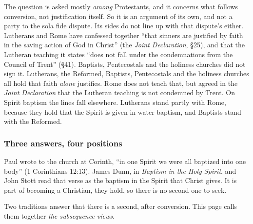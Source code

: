 \documentclass[11pt]{article}
\begin{document}
The question is asked mostly \emph{among} Protestants, and it concerns what follows conversion, not justification itself. So it is an argument of its own, and not a party to the sola fide dispute. Its sides do not line up with that dispute’s either. Lutherans and Rome have confessed together “that sinners are justified by faith in the saving action of God in Christ” (the \emph{Joint Declaration}, §25), and that the Lutheran teaching it states “does not fall under the condemnations from the Council of Trent” (§41). Baptists, Pentecostals and the holiness churches did not sign it. Lutherans, the Reformed, Baptists, Pentecostals and the holiness churches all hold that faith \emph{alone} justifies. Rome does not teach that, but agreed in the \emph{Joint Declaration} that the Lutheran teaching is not condemned by Trent. On Spirit baptism the lines fall elsewhere. Lutherans stand partly with Rome, because they hold that the Spirit is given in water baptism, and Baptists stand with the Reformed.

\subsubsection*{Three answers, four positions}
Paul wrote to the church at Corinth, “in one Spirit we were all baptized into one body” (1 Corinthians 12:13). James Dunn, in \emph{Baptism in the Holy Spirit}, and John Stott read that verse as the baptism in the Spirit that Christ gives. It is part of becoming a Christian, they hold, so there is no second one to seek.

Two traditions answer that there is a second, after conversion. This page calls them together \emph{the subsequence views}.
\end{document}
